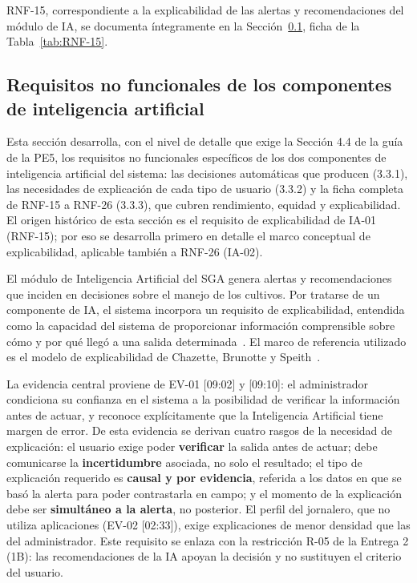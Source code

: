 \documentclass[12pt,a4paper]{article}
\begin{document}
\bigskip
\noindent RNF-15, correspondiente a la explicabilidad de las alertas y recomendaciones del módulo de IA, se documenta íntegramente en la Sección~\ref{sec:explicabilidad-ia}, ficha de la Tabla~\ref{tab:RNF-15}.

\subsection{Requisitos no funcionales de los componentes de inteligencia artificial}
\label{sec:explicabilidad-ia}

Esta sección desarrolla, con el nivel de detalle que exige la Sección 4.4 de la guía de la PE5, los requisitos no funcionales específicos de los dos componentes de inteligencia artificial del sistema: las decisiones automáticas que producen (3.3.1), las necesidades de explicación de cada tipo de usuario (3.3.2) y la ficha completa de RNF-15 a RNF-26 (3.3.3), que cubren rendimiento, equidad y explicabilidad. El origen histórico de esta sección es el requisito de explicabilidad de IA-01 (RNF-15); por eso se desarrolla primero en detalle el marco conceptual de explicabilidad, aplicable también a RNF-26 (IA-02).

El módulo de Inteligencia Artificial del SGA genera alertas y recomendaciones que inciden en decisiones sobre el manejo de los cultivos. Por tratarse de un componente de IA, el sistema incorpora un requisito de explicabilidad, entendida como la capacidad del sistema de proporcionar información comprensible sobre cómo y por qué llegó a una salida determinada~\cite{chazette2020}. El marco de referencia utilizado es el modelo de explicabilidad de Chazette, Brunotte y Speith~\cite{chazette2021,chazette2022}.

La evidencia central proviene de EV-01 [09:02] y [09:10]: el administrador condiciona su confianza en el sistema a la posibilidad de verificar la información antes de actuar, y reconoce explícitamente que la Inteligencia Artificial tiene margen de error. De esta evidencia se derivan cuatro rasgos de la necesidad de explicación: el usuario exige poder \textbf{verificar} la salida antes de actuar; debe comunicarse la \textbf{incertidumbre} asociada, no solo el resultado; el tipo de explicación requerido es \textbf{causal y por evidencia}, referida a los datos en que se basó la alerta para poder contrastarla en campo; y el momento de la explicación debe ser \textbf{simultáneo a la alerta}, no posterior. El perfil del jornalero, que no utiliza aplicaciones (EV-02 [02:33]), exige explicaciones de menor densidad que las del administrador. Este requisito se enlaza con la restricción R-05 de la Entrega 2 (1B): las recomendaciones de la IA apoyan la decisión y no sustituyen el criterio del usuario.
\end{document}
